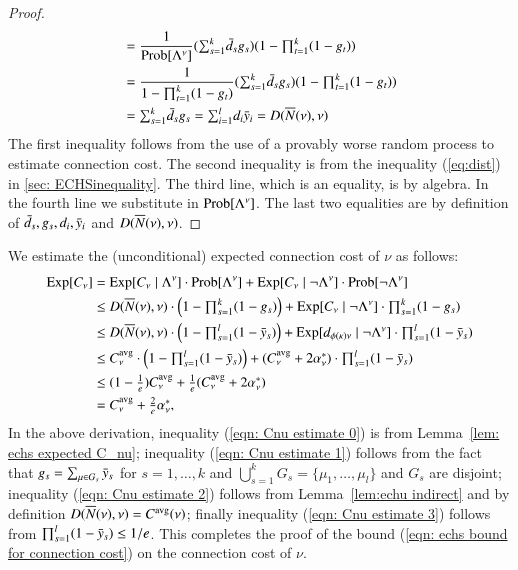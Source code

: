 \begin{proof}
\begin{align*}
  &= \frac{1}{\mbox{\rm Prob}[\Lambda^\nu]} (\textstyle{\sum_{s=1}^k} {\bar d}_s g_s)(1 - \textstyle{\prod_{t=1}^k} (1-g_t))\\
  &= \frac{1}{1 - \textstyle{\prod_{t=1}^k} (1-g_t)}
  (\textstyle{\sum_{s=1}^k} {\bar d}_s g_s) (1 -
  \textstyle{\prod_{t=1}^k} (1-g_t))
  \\
  &=\textstyle{\sum_{s=1}^k} {\bar d}_s g_s 
  = \textstyle{\sum_{i=1}^l} d_i {\bar y}_i = D({\overline{N}}(\nu), \nu)\\
\end{align*}
The first inequality follows from the use of a provably worse random
process to estimate connection cost. The second inequality is from the
inequality (\ref{eq:dist}) in \ref{sec: ECHSinequality}. The third
line, which is an equality, is by algebra. In the fourth line we
substitute in $\mbox{\rm Prob}[\Lambda^\nu]$. The last two equalities are by
definition of ${\bar d}_s, g_s, d_i, {\bar y}_i$ and $D({\overline{N}}(\nu), \nu)$.
\end{proof}

We estimate the (unconditional) expected connection cost of $\nu$ as
follows:
%
\begin{align}
  \notag
  \mbox{\rm Exp}[C_\nu] &= \mbox{\rm Exp}[C_{\nu} \mid \Lambda^\nu] \cdot
  \mbox{\rm Prob}[\Lambda^\nu] + \mbox{\rm Exp}[C_{\nu} \mid \neg \Lambda^\nu] \cdot
  \mbox{\rm Prob}[\neg \Lambda^\nu]
  \\
  &\leq D({\overline{N}}(\nu), \nu) \cdot \left(1 - \textstyle{\prod_{s=1}^k}
  (1-g_s)\right) + \mbox{\rm Exp}[C_{\nu} \mid \neg \Lambda^\nu] \cdot \textstyle{\prod_{s=1}^k}
  (1-g_s)
  \label{eqn: Cnu estimate 0}
  \\
  &\leq D({\overline{N}}(\nu), \nu) \cdot \textstyle \left(1 - \prod_{s=1}^l (1-{\bar y}_s)\right)
  + \mbox{\rm Exp}[ d_{\phi(\kappa)\nu} \mid
  \neg\Lambda^\nu ]\cdot \prod_{s=1}^{l} (1-{\bar y}_{s})
	\label{eqn: Cnu estimate 1}
	\\
  &\leq  C^{{\mbox{\scriptsize\rm avg}}}_{\nu} \cdot \textstyle \left(1 - \prod_{s=1}^l (1-{\bar y}_s)\right)
	+ ( C^{{\mbox{\scriptsize\rm avg}}}_{\nu} + 2\alpha_{\nu}^\ast)  \cdot \prod_{s=1}^{l} (1-{\bar y}_{s})
	\label{eqn: Cnu estimate 2}
	\\
   & \leq \textstyle (1-\frac{1}{e}) C^{{\mbox{\scriptsize\rm avg}}}_{\nu} 
	+	\frac{1}{e}	(C^{{\mbox{\scriptsize\rm avg}}}_{\nu} + 2\alpha_{\nu}^\ast) 
		\label{eqn: Cnu estimate 3}
	\\
	&= \textstyle C^{{\mbox{\scriptsize\rm avg}}}_{\nu} + \frac{2}{e}\alpha_{\nu}^\ast,
	\notag
\end{align}
%
In the above derivation, inequality (\ref{eqn: Cnu estimate 0}) is
from Lemma~\ref{lem: echs expected C_nu}; inequality (\ref{eqn: Cnu
  estimate 1}) follows from the fact that $g_s = \sum_{\mu\in G_s}
{\bar y}_s$ for $s=1,\ldots,k$ and $\bigcup_{s=1}^k G_s = \{\mu_1,
\ldots, \mu_l\}$ and $G_s$ are disjoint; inequality (\ref{eqn: Cnu
  estimate 2}) follows from Lemma~\ref{lem:echu indirect} and by
definition $D({\overline{N}}(\nu), \nu) = C^{{\mbox{\scriptsize\rm avg}}}(\nu)$; finally inequality
(\ref{eqn: Cnu estimate 3}) follows from $\prod_{s=1}^{l}
(1-{\bar y}_{s})\le 1/e$.  This completes the proof of the bound
(\ref{eqn: echs bound for connection cost}) on the connection cost of
$\nu$.

